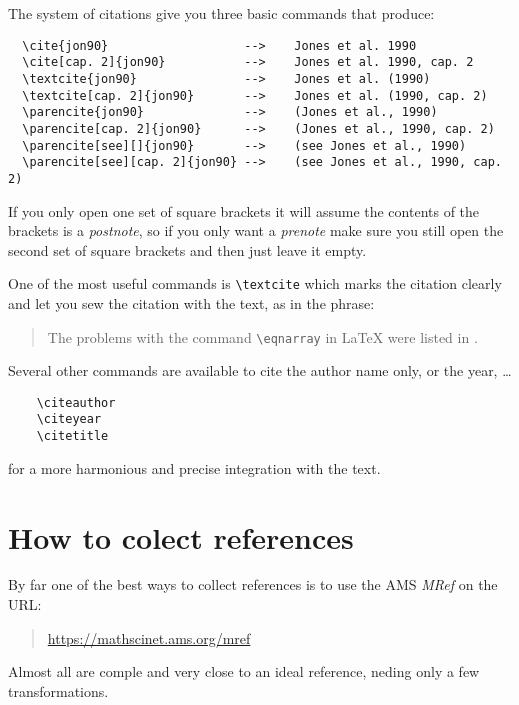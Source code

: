 \documentclass{book}
\begin{document}
The system of citations give you three basic commands that produce:


{\small
\begin{verbatim}
  \cite{jon90}                   -->    Jones et al. 1990
  \cite[cap. 2]{jon90}           -->    Jones et al. 1990, cap. 2
  \textcite{jon90}               -->    Jones et al. (1990)
  \textcite[cap. 2]{jon90}       -->    Jones et al. (1990, cap. 2)
  \parencite{jon90}              -->    (Jones et al., 1990)
  \parencite[cap. 2]{jon90}      -->    (Jones et al., 1990, cap. 2)
  \parencite[see][]{jon90}       -->    (see Jones et al., 1990)
  \parencite[see][cap. 2]{jon90} -->    (see Jones et al., 1990, cap. 2)
\end{verbatim}
}

If you only open one set of square brackets it will assume the
contents of the brackets is a \emph{postnote}, so if you only 
want a \emph{prenote} make sure you still open the second set
of square brackets and then just leave it empty.

One of the most useful commands is \verb+\textcite+ which marks
the citation clearly and let you sew the citation with the text,
as in the phrase:

\begin{quote}
	The problems with the command \verb+\eqnarray+ in \LaTeX{} were
	listed in \textcite{madsen}.
\end{quote}

Several other commands are available to cite the author name only, or the 
year, \dots
\begin{verbatim}
    \citeauthor
    \citeyear
    \citetitle
\end{verbatim}
for a more harmonious and precise integration with the text.

\section{How to colect references}

By far one of the best ways to collect references is to use the AMS \emph{MRef}
on the URL:

\begin{quote}
\url{https://mathscinet.ams.org/mref}
\end{quote}

Almost all are comple and very close to an ideal reference,
neding only a few transformations.
\end{document}
